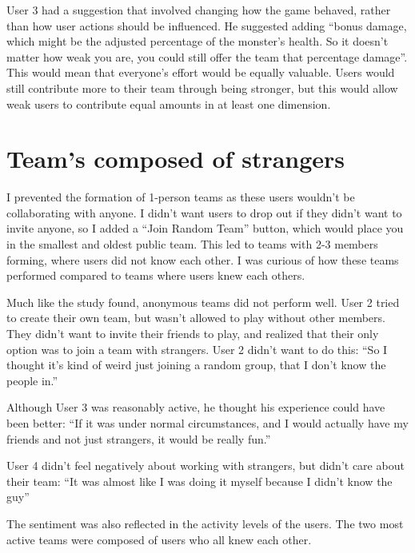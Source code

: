 \documentclass{l4proj}
\begin{document}
User 3 had a suggestion that involved changing how the game behaved, rather than how user actions should be influenced. He suggested adding ``bonus damage, which might be the adjusted percentage of the monster's health. So it doesn't matter how weak you are, you could still offer the team that percentage damage''. This would mean that everyone's effort would be equally valuable. Users would still contribute more to their team through being stronger, but this would allow weak users to contribute equal amounts in at least one dimension. 


\section{Team's composed of strangers}
I prevented the formation of 1-person teams as these users wouldn't be collaborating with anyone. I didn't want users to drop out if they didn't want to invite anyone, so I added a ``Join Random Team'' button, which would place you in the smallest and oldest public team. This led to teams with 2-3 members forming, where users did not know each other. I was curious of how these teams performed compared to teams where users knew each others.

Much like the study \citet{Fish'n'Steps} found, anonymous teams did not perform well. User 2 tried to create their own team, but wasn't allowed to play without other members. They didn't want to invite their friends to play, and realized that their only option was to join a team with strangers. User 2 didn't want to do this: ``So I thought it's kind of weird just joining a random group, that I don't know the people in.'' 

Although User 3 was reasonably active, he thought his experience could have been better: ``If it was under normal circumstances, and I would actually have my friends and not just strangers, it would be really fun.'' 

User 4 didn't feel negatively about working with strangers, but didn't care about their team: ``It was almost like I was doing it myself because I didn't know the guy'' 

The sentiment was also reflected in the activity levels of the users. The two most active teams were composed of users who all knew each other.
\end{document}
